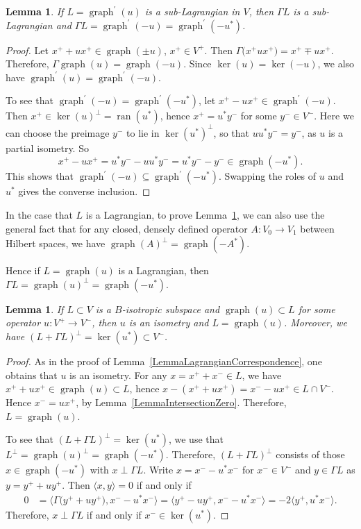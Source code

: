 \documentclass[pdftex]{sigma}
\numberwithin{equation}{section}
\newtheorem{Lemma}[Theorem]{Lemma}
\DeclareMathOperator*{\ran}{ran}
\DeclareMathOperator{\graph}{\mathrm{graph}}
\begin{document}
\begin{Lemma} \label{LemmaOrthogonalComplement}
If $L = \graph^\prime(u)$ is a sub-Lagrangian in $V$, then $\Gamma L$ is a sub-Lagrangian and $\Gamma L = \graph^\prime(-u) = \graph^\prime(-u^*)$.
\end{Lemma}

\begin{proof}
Let $x^+ + ux^+ \in \graph(\pm u)$, $x^+ \in V^+$.
Then $\Gamma\big(x^+ ux^+\big) = x^+ \mp u x^+$.
Therefore, $\Gamma\graph(u) = \graph(-u)$.
Since $\ker(u) = \ker(-u)$, we also have $\graph^\prime(u) = \graph^\prime(-u)$.

To see that $\graph^\prime(-u) = \graph^\prime(-u^*)$, let $x^+ - u x^+ \in \graph^\prime(-u)$.
Then $x^+ \in \ker(u)^\perp = \ran(u^*)$, hence $x^+ = u^* y^-$ for some $y^- \in V^-$.
Here we can choose the preimage $y^-$ to lie in $\ker(u^*)^\perp$, so that $uu^* y^-= y^-$, as $u$ is a partial isometry.
So
\[x^+ - u x^+ = u^*y^- - u u^* y^- = u^*y^- - y^- \in \graph(-u^*).\]
This shows that $\graph^\prime(-u) \subseteq \graph^\prime(-u^*)$.
Swapping the roles of $u$ and $u^*$ gives the converse inclusion.
\end{proof}

\begin{Remark}
In the case that $L$ is a Lagrangian, to prove Lemma~\ref{LemmaOrthogonalComplement}, we can also use the general fact that for any closed, densely defined operator $A\colon V_0 \to V_1$ between Hilbert spaces, we have $\graph(A)^\perp = \graph(-A^*)$.

Hence if $L = \graph(u)$ is a Lagrangian, then $\Gamma L = \graph(u)^\perp = \graph(-u^*)$.
\end{Remark}

\begin{Lemma} \label{LemmaLagrangianContainingGraph}
If $L \subset V$ is a $B$-isotropic subspace and $\graph(u) \subset L$ for some operator $u\colon V^+ \to V^-$, then $u$ is an isometry and $L = \graph(u)$.
Moreover, we have $(L + \Gamma L)^\perp = \ker(u^*) \subset V^-$.
\end{Lemma}

\begin{proof}
As in the proof of Lemma~\ref{LemmaLagrangianCorrespondence}, one obtains that $u$ is an isometry.
For any $x = {x^+ + x^- \in L}$, we have $x^+ + u x^+ \in \graph(u) \subset L$, hence $x - (x^+ + u x^+) = x^- - u x^+ \in L \cap V^-$.
Hence $x^- = u x^+$, by Lemma~\ref{LemmaIntersectionZero}.
Therefore, $L = \graph(u)$.

To see that $(L + \Gamma L)^\perp = \ker(u^*)$, we use that $L^\perp = \graph(u)^\perp = \graph(-u^*)$.
Therefore, $(L + \Gamma L)^\perp$ consists of those $x \in \graph(-u^*)$ with $x \perp \Gamma L$.
Write $x = x^- - u^*x^-$ for $x^- \in V^-$ and $y \in \Gamma L$ as $y = y^+ + u y^+$.
Then $\langle x, y \rangle = 0$ if and only if
\begin{align*}
 0 &= \big\langle \Gamma\big(y^+ + u y^+\big), x^- - u^* x^-\big\rangle = \big\langle y^+ - u y^+, x^- - u^* x^- \big\rangle = - 2\big\langle y^+, u^* x^-\big\rangle.
\end{align*}
Therefore, $x \perp \Gamma L$ if and only if $x^- \in \ker(u^*)$.
\end{proof}
\end{document}
